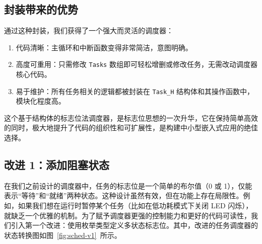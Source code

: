 \subsection{封装带来的优势}

通过这种封装，我们获得了一个强大而灵活的调度器：

\begin{enumerate}
\item 代码清晰：主循环和中断函数变得非常简洁，意图明确。
\item 高度可重用：只需修改 \texttt{Tasks} 数组即可轻松增删或修改任务，无需改动调度器核心代码。
\item 易于维护：所有任务相关的逻辑都被封装在 \texttt{Task\_H} 结构体和其操作函数中，模块化程度高。
\end{enumerate}

这个基于结构体的标志位法调度器，是标志位思想的一次升华，它在保持简单高效的同时，极大地提升了代码的组织性和可扩展性，是构建中小型嵌入式应用的绝佳选择。

\subsection{改进 1：添加阻塞状态}

在我们之前设计的调度器中，任务的标志位是一个简单的布尔值（0 或 1），仅能表示“等待”和“就绪”两种状态。这种设计虽然有效，但在功能上存在局限性。例如，如果我们想在运行时暂停某个任务（比如在低功耗模式下关闭 LED 闪烁），就缺乏一个优雅的机制。为了赋予调度器更强的控制能力和更好的代码可读性，我们引入第一个改进：使用枚举类型定义多状态标志位。其中，改进的任务调度器的状态转换图如图~\ref{fig:sched-v1}~所示。

